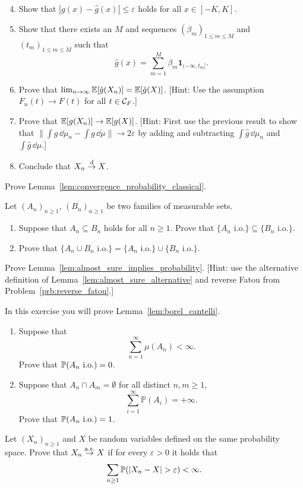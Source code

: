 \begin{problem}
\begin{enumerate}[label={(\alph*)}]
\setcounter{enumi}{3}
\item Show that $|g(x) - \hat{g}(x)| \le \varepsilon$ holds for all $x \in [-K , K]$.
\item Show that there exists an $M$ and sequences $(\beta_m)_{1 \le m \le M}$ and $(t_m)_{1 \le m \le M}$ such that
\[
	\hat{g}(x) = \sum_{m = 1}^M \beta_m \mathbf{1}_{(-\infty, t_m]}.
\]
\item Prove that $\lim_{n \to \infty} \mathbb E[\hat{g}(X_n)] = \mathbb E[\hat{g}(X)]$. [Hint: Use the assumption $F_n(t) \to F(t)$ for all $t \in \mathcal C_F$.]
\item Prove that $\mathbb E[g(X_n)] \to \mathbb E[g(X)]$. [Hint: First use the previous result to show that $\| \int g \, \dd \mu_n - \int g \, \dd \mu\| \to 2\varepsilon$ by adding and subtracting $\int \hat{g} \, \dd \mu_n$ and $\int \hat{g} \, \dd \mu$.]
\item Conclude that $X_n \stackrel{d}{\rightarrow} X$.
\end{enumerate}
\end{problem}

\begin{problem}\label{prb:convergence_probability_classic}
Prove Lemma~\ref{lem:convergence_probability_classical}.
\end{problem}

\begin{problem}\label{prb:properties_io}
Let $(A_n)_{n \ge 1}$, $(B_n)_{n \ge 1}$ be two families of measurable sets. 
\begin{enumerate}[label={(\alph*)}]
\item Suppose that $A_n \subseteq B_n$ holds for all $n \ge 1$. Prove that $\{A_n \text{ i.o.}\} \subseteq \{B_n \text{ i.o.}\}$.
\item Prove that $\{A_n \cup B_n \text{ i.o.}\} = \{A_n \text{ i.o.}\} \cup \{B_n \text{ i.o.}\}$.
\end{enumerate}
\end{problem}

\begin{problem}\label{prb:almost_sure_implies_probability}
Prove Lemma~\ref{lem:almost_sure_implies_probability}. [Hint: use the alternative definition of Lemma~\ref{lem:almost_sure_alternative} and reverse Fatou from Problem~\ref{prb:reverse_fatou}.]
\end{problem}

\begin{problem}\label{prb:borel_cantelli}
In this exercise you will prove Lemma~\ref{lem:borel_cantelli}.

\begin{enumerate}[label={(\alph*)}]
\item Suppose that
\[
	\sum_{n=1}^\infty \mu(A_n) < \infty.
\]
Prove that $\mathbb P(A_n \text{ i.o.}) = 0$.
\item Suppose that $A_n \cap A_m = \emptyset$ for all distinct $n,m \ge 1$,
\[
	\sum_{i=1}^\infty \mathbb{P}(A_i) = +\infty.
\]
Prove that $\mathbb P(A_n \text{ i.o.}) = 1$.
\end{enumerate}
\end{problem}

\begin{problem}
Let $(X_n)_{n \ge 1}$ and $X$ be random variables defined on the same probability space. Prove that $X_n \stackrel{\mathrm{a.s.}}{\rightarrow} X$ if for every $\varepsilon > 0$ it holds that
\[
	\sum_{n \ge 1} \mathbb P(|X_n - X| > \varepsilon) < \infty.
\]
\end{problem}
